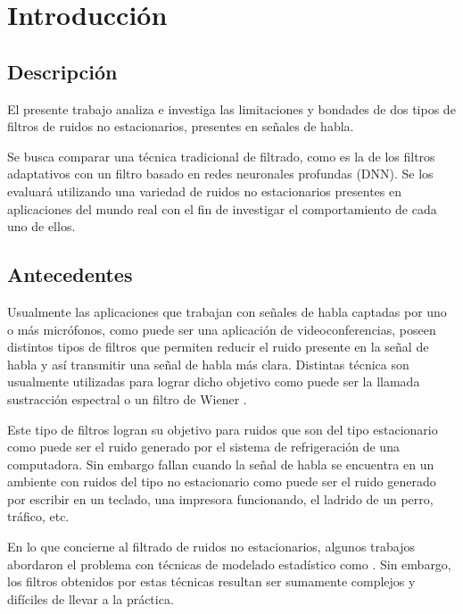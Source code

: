 \section{Introducción}

\subsection{Descripción}

El presente trabajo analiza e investiga las limitaciones y bondades de dos tipos de filtros de ruidos no estacionarios, presentes en señales de habla.

Se busca comparar una técnica tradicional de filtrado, como es la de los filtros adaptativos con un filtro basado en redes neuronales profundas (DNN). Se los evaluará utilizando una variedad de ruidos no estacionarios presentes en aplicaciones del mundo real con el fin de investigar el comportamiento de cada uno de ellos.

\subsection{Antecedentes}

Usualmente las aplicaciones que trabajan con señales de habla captadas por uno o más micrófonos, como puede ser una aplicación de videoconferencias, poseen distintos tipos de filtros que permiten reducir el ruido presente en la señal de habla y así transmitir una señal de habla más clara. Distintas técnica son usualmente utilizadas para lograr dicho objetivo como puede ser la llamada sustracción espectral \cite{espectral_subtraction} o un filtro de Wiener \cite{philipos_book_speech_enhancement}.

Este tipo de filtros logran su objetivo para ruidos que son del tipo estacionario como puede ser el ruido generado por el sistema de refrigeración de una computadora. Sin embargo fallan cuando la señal de habla se encuentra en un ambiente con ruidos del tipo no estacionario como puede ser el ruido generado por escribir en un teclado, una impresora funcionando, el ladrido de un perro, tráfico, etc.  

En lo que concierne al filtrado de ruidos no estacionarios, algunos trabajos abordaron el problema con técnicas de modelado estadístico como \cite{speech_enhancement_for_non_stationary_noise_environments_using_statistical_estimators}. Sin embargo, los filtros obtenidos por estas técnicas resultan ser sumamente complejos y difíciles de llevar a la práctica.

